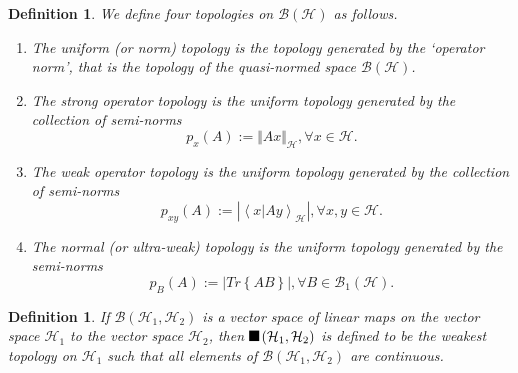 \documentclass[aps,preprint]{revtex4}%
\providecommand{\U}[1]{\protect\rule{.1in}{.1in}}
\newtheorem{definition}[theorem]{Definition}
\begin{document}
\begin{definition}
We define four topologies on $\mathcal{B}\left(  \mathcal{H}\right)  $ as follows.

\begin{enumerate}
\item The \emph{uniform (or norm) topology} is the topology generated by the
`operator norm', that is the topology of the quasi-normed space $\mathcal{B}%
\left(  \mathcal{H}\right)  $.

\item The \emph{strong operator topology} is the uniform topology generated by
the collection of semi-norms
\begin{equation}
p_{x}(A):=\Vert Ax\Vert_{\mathcal{H}},\forall x\in\mathcal{H}.
\end{equation}


\item The \emph{weak operator topology} is the uniform topology generated by
the collection of semi-norms
\begin{equation}
p_{xy}(A):=|\left\langle \left.  x\right\vert Ay\right\rangle _{\mathcal{H}%
}|,\forall x,y\in\mathcal{H}.
\end{equation}


\item The \emph{normal (or ultra-weak) topology} is the uniform topology
generated by the semi-norms
\begin{equation}
p_{B}(A):=|Tr\left\{  AB\right\}  |,\forall B\in\mathcal{B}_{1}\left(
\mathcal{H}\right)  .
\end{equation}

\end{enumerate}
\end{definition}

\begin{definition}
If $\mathcal{B}\left(  \mathcal{H}_{1},\mathcal{H}_{2}\right)  $ is a vector
space of linear maps on the vector space $\mathcal{H}_{1}$ to the vector space
$\mathcal{H}_{2}$, then $\U{3c3} \left(  \mathcal{H}_{1},\mathcal{H}%
_{2}\right)  $ is defined to be the weakest topology on $\mathcal{H}_{1}$ such
that all elements of $\mathcal{B}\left(  \mathcal{H}_{1},\mathcal{H}%
_{2}\right)  $ are continuous.
\end{definition}
\end{document}
